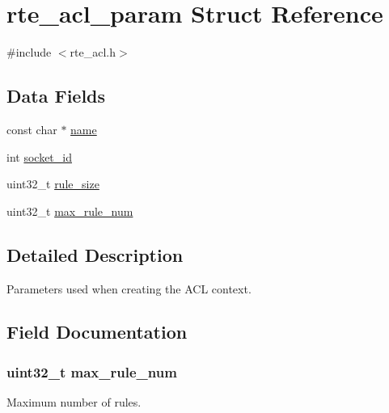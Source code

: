\hypertarget{structrte__acl__param}{}\section{rte\+\_\+acl\+\_\+param Struct Reference}
\label{structrte__acl__param}


{\ttfamily \#include $<$rte\+\_\+acl.\+h$>$}

\subsection*{Data Fields}
\begin{DoxyCompactItemize}
\item 
const char $\ast$ \hyperlink{structrte__acl__param_a8f8f80d37794cde9472343e4487ba3eb}{name}
\item 
int \hyperlink{structrte__acl__param_a229cb0bd24215f0cb940e0724dbd4d55}{socket\+\_\+id}
\item 
uint32\+\_\+t \hyperlink{structrte__acl__param_a9d9bf36dd2be0faabab8927ef50ce2f7}{rule\+\_\+size}
\item 
uint32\+\_\+t \hyperlink{structrte__acl__param_a91a71cf1b8f6c168408bd216322b8437}{max\+\_\+rule\+\_\+num}
\end{DoxyCompactItemize}


\subsection{Detailed Description}
Parameters used when creating the A\+C\+L context. 

\subsection{Field Documentation}
\hypertarget{structrte__acl__param_a91a71cf1b8f6c168408bd216322b8437}{}
\subsubsection[{max\+\_\+rule\+\_\+num}]{\setlength{\rightskip}{0pt plus 5cm}uint32\+\_\+t max\+\_\+rule\+\_\+num}\label{structrte__acl__param_a91a71cf1b8f6c168408bd216322b8437}
Maximum number of rules. \hypertarget{structrte__acl__param_a8f8f80d37794cde9472343e4487ba3eb}{}
